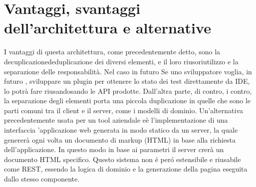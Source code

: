     \section{Vantaggi, svantaggi dell'architettura e alternative}
        I vantaggi di questa architettura, come precedentemente detto, sono la decuplicazionededuplicazione dei diversi elementi, e il loro riusoriutilizzo  e la separazione delle responsabilità.
        Nel caso in futuro Se uno sviluppatore voglia, in futuro , sviluppare un plugin per ottenere lo stato dei test direttamente da IDE, lo potrà fare riusandosando le API prodotte.
        Dall'altra parte, di contro, i contro, la separazione degli elementi porta una piccola duplicazione in quelle che sono le parti comuni tra il client e il server, come i modelli di dominio.
        Un'alternativa precedentemente usata per un tool aziendale eè l'implementazione di una interfaccia ’applicazione web generata in modo statico da un server, la quale genererà ogni volta un documento di markup (HTML) in base alla richiesta dell’applicazione.
        In questo modo in base ai parametri il server crerà un documento HTML specifico.
        Questo sistema non \'e per\'o estensibile e riusabile come REST, essendo la logica di dominio e la generazione della pagina eseguita dallo stesso componente.
